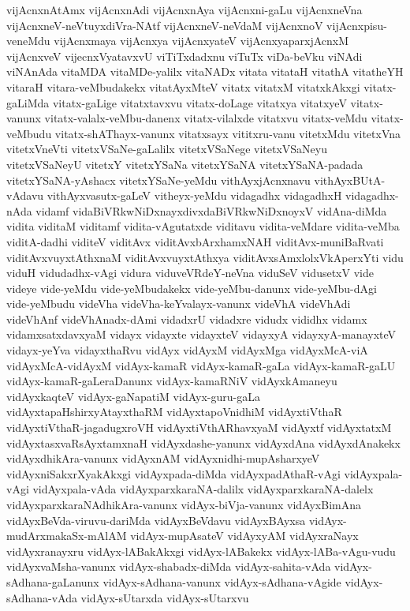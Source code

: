 {vijAcnxnAtAmx
vijAcnxnAdi
vijAcnxnAya
vijAcnxni-gaLu
vijAcnxneVna
vijAcnxneV-neVtuyxdiVra-NAtf
vijAcnxneV-neVdaM
vijAcnxnoV
vijAcnxpisu-veneMdu
vijAcnxmaya
vijAcnxya
vijAcnxyateV
vijAcnxyaparxjAcnxM
vijAcnxveV
vijecnxVyatavxvU
viTiTxdadxnu
viTuTx
viDa-beVku
viNAdi
viNAnAda
vitaMDA
vitaMDe-yalilx
vitaNADx
vitata
vitataH
vitathA
vitatheYH
vitaraH
vitara-veMbudakekx
vitatAyxMteV
vitatx
vitatxM
vitatxkAkxgi
vitatx-gaLiMda
vitatx-gaLige
vitatxtavxvu
vitatx-doLage
vitatxya
vitatxyeV
vitatx-vanunx
vitatx-valalx-veMbu-danenx
vitatx-vilalxde
vitatxvu
vitatx-veMdu
vitatx-veMbudu
vitatx-shAThayx-vanunx
vitatxsayx
vititxru-vanu
vitetxMdu
vitetxVna
vitetxVneVti
vitetxVSaNe-gaLalilx
vitetxVSaNege
vitetxVSaNeyu
vitetxVSaNeyU
vitetxY
vitetxYSaNa
vitetxYSaNA
vitetxYSaNA-padada
vitetxYSaNA-yAshacx
vitetxYSaNe-yeMdu
vithAyxjAcnxnavu
vithAyxBUtA-vAdavu
vithAyxvasutx-gaLeV
vitheyx-yeMdu
vidagadhx
vidagadhxH
vidagadhx-nAda
vidamf
vidaBiVRkwNiDxnayxdivxdaBiVRkwNiDxnoyxV
vidAna-diMda
vidita
viditaM
viditamf
vidita-vAgutatxde
viditavu
vidita-veMdare
vidita-veMba
viditA-dadhi
viditeV
viditAvx
viditAvxbArxhamxNAH
viditAvx-muniBaRvati
viditAvxvuyxtAthxnaM
viditAvxvuyxtAthxya
viditAvxsAmxlolxVkAperxYti
vidu
viduH
vidudadhx-vAgi
vidura
viduveVRdeY-neVna
viduSeV
vidusetxV
vide
videye
vide-yeMdu
vide-yeMbudakekx
vide-yeMbu-danunx
vide-yeMbu-dAgi
vide-yeMbudu
videVha
videVha-keYvalayx-vanunx
videVhA
videVhAdi
videVhAnf
videVhAnadx-dAmi
vidadxrU
vidadxre
vidudx
vididhx
vidamx
vidamxsatxdavxyaM
vidayx
vidayxte
vidayxteV
vidayxyA
vidayxyA-manayxteV
vidayx-yeYva
vidayxthaRvu
vidAyx
vidAyxM
vidAyxMga
vidAyxMcA-viA
vidAyxMcA-vidAyxM
vidAyx-kamaR
vidAyx-kamaR-gaLa
vidAyx-kamaR-gaLU
vidAyx-kamaR-gaLeraDanunx
vidAyx-kamaRNiV
vidAyxkAmaneyu
vidAyxkaqteV
vidAyx-gaNapatiM
vidAyx-guru-gaLa
vidAyxtapaHshirxyAtayxthaRM
vidAyxtapoVnidhiM
vidAyxtiVthaR
vidAyxtiVthaR-jagadugxroVH
vidAyxtiVthARhavxyaM
vidAyxtf
vidAyxtatxM
vidAyxtasxvaRsAyxtamxnaH
vidAyxdashe-yanunx
vidAyxdAna
vidAyxdAnakekx
vidAyxdhikAra-vanunx
vidAyxnAM
vidAyxnidhi-mupAsharxyeV
vidAyxniSakxrXyakAkxgi
vidAyxpada-diMda
vidAyxpadAthaR-vAgi
vidAyxpala-vAgi
vidAyxpala-vAda
vidAyxparxkaraNA-dalilx
vidAyxparxkaraNA-dalelx
vidAyxparxkaraNAdhikAra-vanunx
vidAyx-biVja-vanunx
vidAyxBimAna
vidAyxBeVda-viruvu-dariMda
vidAyxBeVdavu
vidAyxBAyxsa
vidAyx-mudArxmakaSx-mAlAM
vidAyx-mupAsateV
vidAyxyAM
vidAyxraNayx
vidAyxranayxru
vidAyx-lABakAkxgi
vidAyx-lABakekx
vidAyx-lABa-vAgu-vudu
vidAyxvaMsha-vanunx
vidAyx-shabadx-diMda
vidAyx-sahita-vAda
vidAyx-sAdhana-gaLanunx
vidAyx-sAdhana-vanunx
vidAyx-sAdhana-vAgide
vidAyx-sAdhana-vAda
vidAyx-sUtarxda
vidAyx-sUtarxvu
}
